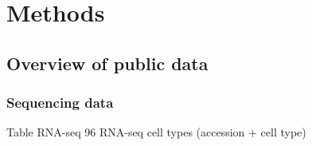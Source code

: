




\section{Methods}

\subsection{Overview of public data}

\subsubsection{Sequencing data}

Table RNA-seq
96  RNA-seq cell types (accession + cell type)
 
